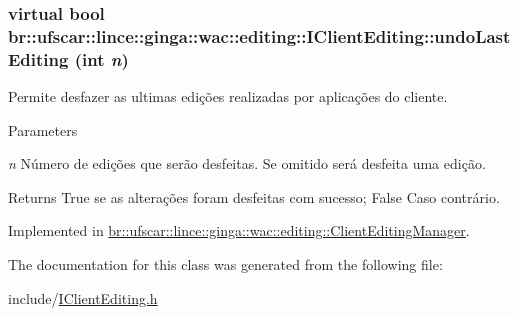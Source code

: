 \hypertarget{classbr_1_1ufscar_1_1lince_1_1ginga_1_1wac_1_1editing_1_1IClientEditing_a8b8cd2e9f79545630e04334d6366e28e}{
\subsubsection[{undoLastEditing}]{\setlength{\rightskip}{0pt plus 5cm}virtual bool br::ufscar::lince::ginga::wac::editing::IClientEditing::undoLastEditing (int {\em n})}}
\label{classbr_1_1ufscar_1_1lince_1_1ginga_1_1wac_1_1editing_1_1IClientEditing_a8b8cd2e9f79545630e04334d6366e28e}


Permite desfazer as ultimas edições realizadas por aplicações do cliente. 


\begin{DoxyParams}{Parameters}
\item[{\em n}]Número de edições que serão desfeitas. Se omitido será desfeita uma edição. \end{DoxyParams}
\begin{DoxyReturn}{Returns}
True se as alterações foram desfeitas com sucesso; False Caso contrário. 
\end{DoxyReturn}


Implemented in \hyperlink{classbr_1_1ufscar_1_1lince_1_1ginga_1_1wac_1_1editing_1_1ClientEditingManager_a7094577521bafedebcd7edafe753774f}{br::ufscar::lince::ginga::wac::editing::ClientEditingManager}.



The documentation for this class was generated from the following file:\begin{DoxyCompactItemize}
\item 
include/\hyperlink{IClientEditing_8h}{IClientEditing.h}\end{DoxyCompactItemize}
